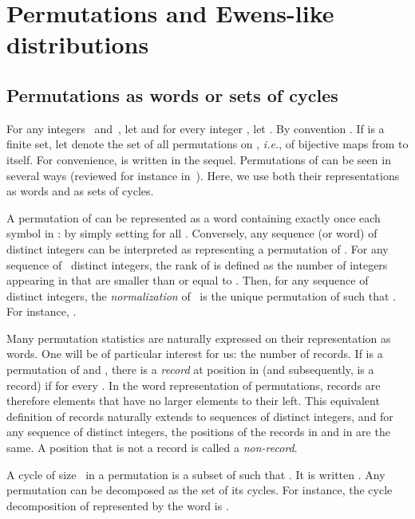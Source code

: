 \documentclass[proceedings]{aofa}
\begin{document}
\section{Permutations and Ewens-like distributions}\label{sec:def}

\subsection{Permutations as words or sets of cycles}\label{sec:permutations}

For any integers~ and~, let  and for every integer , let . 
By convention . 
If  is a finite set, let  denote the set of all permutations on , \emph{i.e.}, of bijective maps from  to itself. 
For convenience,  is written  in the sequel. 
Permutations of  can be seen in several ways (reviewed for instance in~\cite{Bona}). 
Here, we use both their representations as words and as sets of cycles. 

A permutation  of  can be represented as a word  containing exactly once each symbol in : 
by simply setting  for all . 
Conversely, any sequence (or word) of  distinct integers can be interpreted as representing a permutation of . 
For any sequence  of~ distinct integers, the rank  of  is defined as
the number of integers appearing in  that are smaller than or equal to .
Then, for any sequence  of  distinct integers, the \emph{normalization}  of~ is the
unique permutation  of  such that . For instance, .

Many permutation statistics are naturally expressed on their representation as words. 
One will be of particular interest for us: the number of records. 
If  is a permutation of  and ,
there is a \emph{record} at position  in  (and subsequently,  is a record) if  for every . 
In the word representation of permutations, records are therefore elements that have no larger elements to their left. 
This equivalent definition of records naturally extends to sequences of distinct integers, and 
for any sequence  of distinct integers, the positions of the records in  and in  are the same. 
A position that is not a record is called a \emph{non-record}.

A cycle of size~ in a permutation  is a subset  of  such that 
. 
It is written . 
Any permutation can be decomposed as the set of its cycles. 
For instance, the cycle decomposition of  represented by the word  is . 
\end{document}
